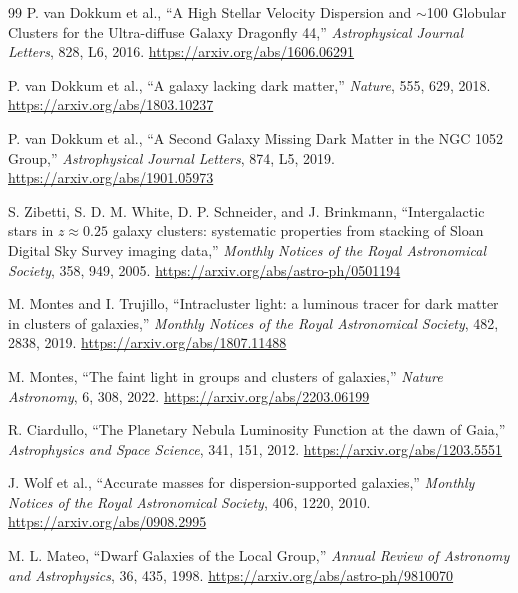 \begin{thebibliography}{99}
P. van Dokkum et al.,
``A High Stellar Velocity Dispersion and $\sim$100 Globular Clusters for the Ultra-diffuse Galaxy Dragonfly 44,''
\emph{Astrophysical Journal Letters}, 828, L6, 2016.
\url{https://arxiv.org/abs/1606.06291}

P. van Dokkum et al.,
``A galaxy lacking dark matter,''
\emph{Nature}, 555, 629, 2018.
\url{https://arxiv.org/abs/1803.10237}

P. van Dokkum et al.,
``A Second Galaxy Missing Dark Matter in the NGC 1052 Group,''
\emph{Astrophysical Journal Letters}, 874, L5, 2019.
\url{https://arxiv.org/abs/1901.05973}

S. Zibetti, S. D. M. White, D. P. Schneider, and J. Brinkmann,
``Intergalactic stars in $z\approx0.25$ galaxy clusters: systematic properties from stacking of Sloan Digital Sky Survey imaging data,''
\emph{Monthly Notices of the Royal Astronomical Society}, 358, 949, 2005.
\url{https://arxiv.org/abs/astro-ph/0501194}

M. Montes and I. Trujillo,
``Intracluster light: a luminous tracer for dark matter in clusters of galaxies,''
\emph{Monthly Notices of the Royal Astronomical Society}, 482, 2838, 2019.
\url{https://arxiv.org/abs/1807.11488}

M. Montes,
``The faint light in groups and clusters of galaxies,''
\emph{Nature Astronomy}, 6, 308, 2022.
\url{https://arxiv.org/abs/2203.06199}

R. Ciardullo,
``The Planetary Nebula Luminosity Function at the dawn of Gaia,''
\emph{Astrophysics and Space Science}, 341, 151, 2012.
\url{https://arxiv.org/abs/1203.5551}

J. Wolf et al.,
``Accurate masses for dispersion-supported galaxies,''
\emph{Monthly Notices of the Royal Astronomical Society}, 406, 1220, 2010.
\url{https://arxiv.org/abs/0908.2995}

M. L. Mateo,
``Dwarf Galaxies of the Local Group,''
\emph{Annual Review of Astronomy and Astrophysics}, 36, 435, 1998.
\url{https://arxiv.org/abs/astro-ph/9810070}


\end{thebibliography}
